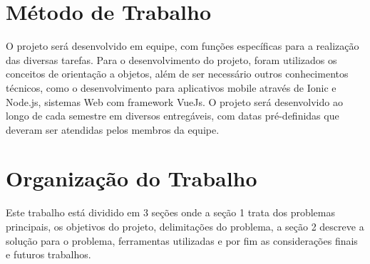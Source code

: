 \section{Método de Trabalho}
O projeto será desenvolvido em equipe, com funções específicas para a realização das diversas tarefas. Para o desenvolvimento do projeto, foram utilizados os conceitos de orientação a objetos, além de ser necessário outros conhecimentos técnicos, como o desenvolvimento para aplicativos mobile através de Ionic e Node.js, sistemas Web com framework VueJs. O projeto será desenvolvido ao longo de cada semestre em diversos entregáveis, com datas pré-definidas que deveram ser atendidas pelos membros da equipe.
\section{Organização do Trabalho}
Este trabalho está dividido em  3 seções onde a seção 1 trata  dos problemas principais, os objetivos do projeto, delimitações do problema, a seção 2 descreve a solução para o problema, ferramentas utilizadas e por fim as considerações finais e futuros trabalhos.